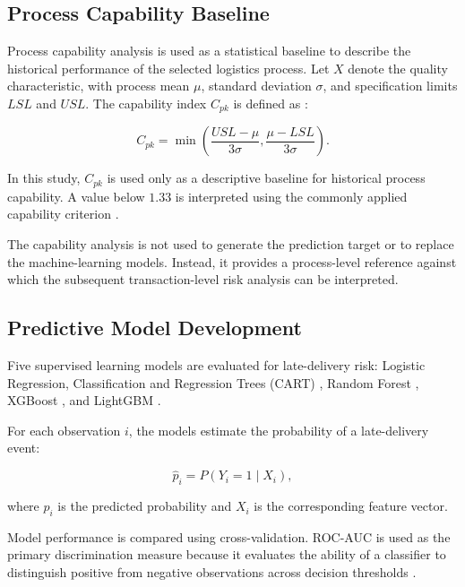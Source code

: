 \documentclass[manuscript, screen, review]{acmart}
\begin{document}
\subsection{Process Capability Baseline}

Process capability analysis is used as a statistical baseline to
describe the historical performance of the selected logistics process.
Let $X$ denote the quality characteristic, with process mean $\mu$,
standard deviation $\sigma$, and specification limits $LSL$ and $USL$.
The capability index $C_{pk}$ is defined as
\cite{montgomery2019introduction}:

\begin{equation}
C_{pk} =
\min\left(
\frac{USL-\mu}{3\sigma},
\frac{\mu-LSL}{3\sigma}
\right).
\end{equation}

In this study, $C_{pk}$ is used only as a descriptive baseline for
historical process capability. A value below $1.33$ is interpreted using
the commonly applied capability criterion
\cite{montgomery2019introduction}.

The capability analysis is not used to generate the prediction target
or to replace the machine-learning models. Instead, it provides a
process-level reference against which the subsequent transaction-level
risk analysis can be interpreted.

\subsection{Predictive Model Development}

Five supervised learning models are evaluated for late-delivery risk:
Logistic Regression, Classification and Regression Trees (CART)
\cite{breiman1984classification}, Random Forest
\cite{breiman2001random}, XGBoost \cite{chen2016xgboost}, and LightGBM
\cite{ke2017lightgbm}.

For each observation $i$, the models estimate the probability of a
late-delivery event:

\begin{equation}
\hat{p}_i = P(Y_i=1\mid X_i),
\label{eq:prediction_probability}
\end{equation}

where $\hat{p}_i$ is the predicted probability and $X_i$ is the
corresponding feature vector.

Model performance is compared using cross-validation. ROC-AUC is used
as the primary discrimination measure because it evaluates the ability
of a classifier to distinguish positive from negative observations
across decision thresholds \cite{fawcett2006introduction}.
\end{document}
